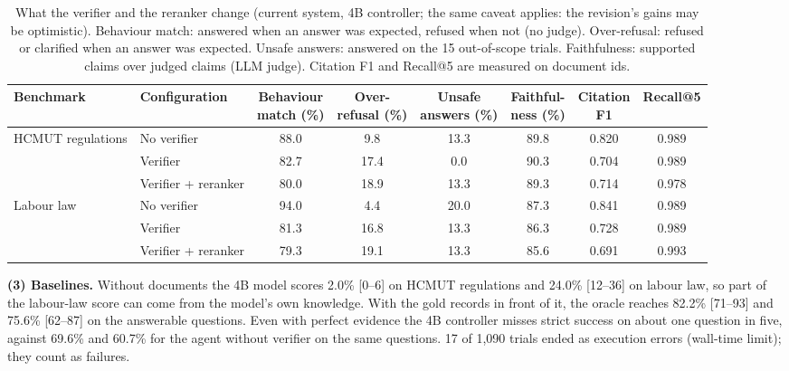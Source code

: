 \documentclass[a4paper,11pt]{article}
\newcommand{\tabstyle}{\centering\small\renewcommand{\arraystretch}{1.1}\setlength{\tabcolsep}{4pt}}
\begin{document}
\begin{table}[!htbp]\tabstyle
\begin{tabular}{@{}llcccccc@{}}
\toprule Benchmark & Configuration & \makecell{Behaviour\\match (\%)} & \makecell{Over-\\refusal (\%)} & \makecell{Unsafe\\answers (\%)} & \makecell{Faithful-\\ness (\%)} & \makecell{Citation\\F1} & Recall@5\\\midrule
\multirow{3}{*}{HCMUT regulations} & No verifier & 88.0 & 9.8 & 13.3 & 89.8 & 0.820 & 0.989\\
 & Verifier & 82.7 & 17.4 & 0.0 & 90.3 & 0.704 & 0.989\\
 & Verifier + reranker & 80.0 & 18.9 & 13.3 & 89.3 & 0.714 & 0.978\\\midrule
\multirow{3}{*}{Labour law} & No verifier & 94.0 & 4.4 & 20.0 & 87.3 & 0.841 & 0.989\\
 & Verifier & 81.3 & 16.8 & 13.3 & 86.3 & 0.728 & 0.989\\
 & Verifier + reranker & 79.3 & 19.1 & 13.3 & 85.6 & 0.691 & 0.993\\
\bottomrule\end{tabular}
\caption{What the verifier and the reranker change (current system, 4B controller; the same caveat applies: the revision's gains may be optimistic). Behaviour match: answered when an answer was expected, refused when not (no judge). Over-refusal: refused or clarified when an answer was expected. Unsafe answers: answered on the 15 out-of-scope trials. Faithfulness: supported claims over judged claims (LLM judge). Citation F1 and Recall@5 are measured on document ids.}\label{tab:diag}
\end{table}

\par\noindent\textbf{(3) Baselines.} Without documents the 4B model scores 2.0\% [0--6] on HCMUT regulations and 24.0\% [12--36] on labour law, so part of the labour-law score can come from the model's own knowledge. With the gold records in front of it, the oracle reaches 82.2\% [71--93] and 75.6\% [62--87] on the answerable questions. Even with perfect evidence the 4B controller misses strict success on about one question in five, against 69.6\% and 60.7\% for the agent without verifier on the same questions. 17 of 1,090 trials ended as execution errors (wall-time limit); they count as failures.
\end{document}
